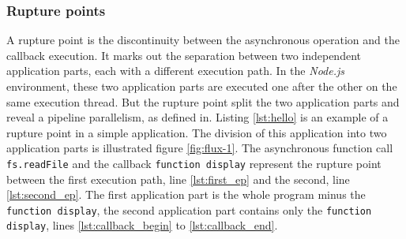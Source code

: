  

\subsubsection{Rupture points}

A rupture point is the discontinuity between the asynchronous operation and the callback execution.
It marks out the separation between two independent application parts, each with a different execution path.
In the \textit{Node.js} environment, these two application parts are executed one after the other on the same execution thread.
But the rupture point split the two application parts and reveal a pipeline parallelism, as defined in\cite{Gordon2006}.
Listing \ref{lst:hello} is an example of a rupture point in a simple application.
The division of this application into two application parts is illustrated figure \ref{fig:flux-1}.
The asynchronous function call \texttt{fs.readFile} and the callback \texttt{function display} represent the rupture point between the first execution path, line \ref{lst:first_ep} and the second, line \ref{lst:second_ep}.
The first application part is the whole program minus the \texttt{function display}, the second application part contains only the \texttt{function display}, lines \ref{lst:callback_begin} to \ref{lst:callback_end}.

